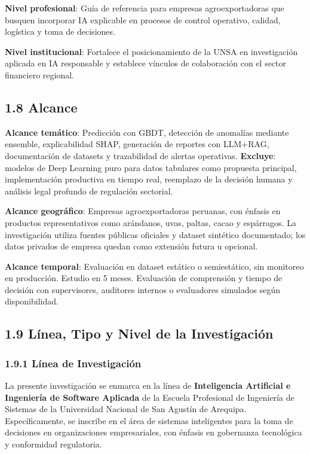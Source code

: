 \textbf{Nivel profesional}: Guía de referencia para empresas
agroexportadoras que busquen incorporar IA explicable en procesos de
control operativo, calidad, logística y toma de decisiones.

\textbf{Nivel institucional}: Fortalece el posicionamiento de la UNSA en
investigación aplicada en IA responsable y establece vínculos de
colaboración con el sector financiero regional.

\subsection{1.8 Alcance}\label{alcance}

\textbf{Alcance temático}: Predicción con GBDT, detección de anomalías
mediante ensemble, explicabilidad SHAP, generación de reportes con
LLM+RAG, documentación de datasets y trazabilidad de alertas operativas.
\textbf{Excluye}: modelos de Deep Learning puro para datos tabulares
como propuesta principal, implementación productiva en tiempo real,
reemplazo de la decisión humana y análisis legal profundo de regulación
sectorial.

\textbf{Alcance geográfico}: Empresas agroexportadoras peruanas, con
énfasis en productos representativos como arándanos, uvas, paltas, cacao
y espárragos. La investigación utiliza fuentes públicas oficiales y
dataset sintético documentado; los datos privados de empresa quedan como
extensión futura u opcional.

\textbf{Alcance temporal}: Evaluación en dataset estático o
semiestático, sin monitoreo en producción. Estudio en 5 meses.
Evaluación de comprensión y tiempo de decisión con supervisores,
auditores internos o evaluadores simulados según disponibilidad.

\subsection{1.9 Línea, Tipo y Nivel de la
Investigación}\label{luxednea-tipo-y-nivel-de-la-investigaciuxf3n}

\subsubsection{1.9.1 Línea de
Investigación}\label{luxednea-de-investigaciuxf3n}

La presente investigación se enmarca en la línea de \textbf{Inteligencia
Artificial e Ingeniería de Software Aplicada} de la Escuela Profesional
de Ingeniería de Sistemas de la Universidad Nacional de San Agustín de
Arequipa. Específicamente, se inscribe en el área de sistemas
inteligentes para la toma de decisiones en organizaciones empresariales,
con énfasis en gobernanza tecnológica y conformidad regulatoria.

